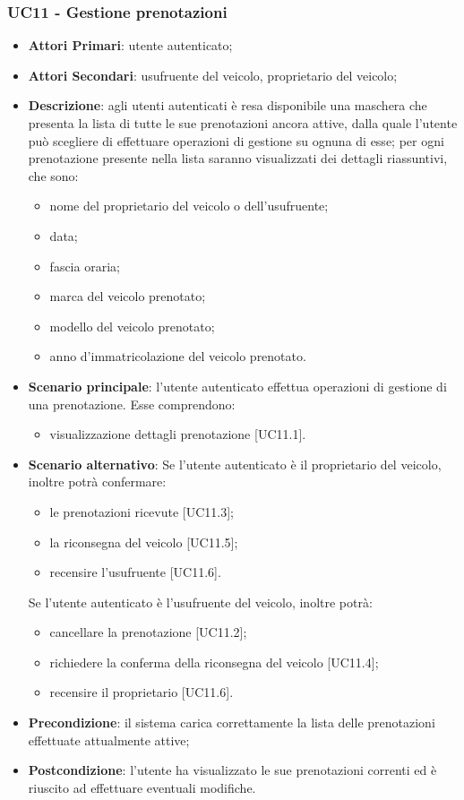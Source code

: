 \subsubsection{UC11 - Gestione prenotazioni}
\begin{itemize}
	\item \textbf{Attori Primari}: utente autenticato;
	\item \textbf{Attori Secondari}:
	usufruente del veicolo, proprietario del veicolo;
	\item \textbf{Descrizione}: agli utenti autenticati è resa disponibile una maschera che presenta la lista di tutte le sue prenotazioni ancora attive, dalla quale l'utente può scegliere di effettuare operazioni di gestione su ognuna di esse;
	per ogni prenotazione presente nella lista saranno visualizzati dei dettagli riassuntivi, che sono:
	\begin{itemize}
		\item nome del proprietario del veicolo o dell'usufruente;
		\item data;
		\item fascia oraria;
		\item marca del veicolo prenotato;
		\item modello del veicolo prenotato;
		\item anno d'immatricolazione del veicolo prenotato.
	\end{itemize}
	\item \textbf{Scenario principale}: l'utente autenticato effettua operazioni di gestione di una prenotazione. Esse comprendono:
	\begin{itemize}
		\item visualizzazione dettagli prenotazione [UC11.1].
	\end{itemize}
	\item \textbf{Scenario alternativo}: Se l'utente autenticato è il proprietario del veicolo, inoltre potrà confermare:
	\begin{itemize}
		\item le prenotazioni ricevute [UC11.3];
		\item la riconsegna del veicolo [UC11.5];
		\item recensire l'usufruente [UC11.6].
	\end{itemize}
	Se l'utente autenticato è l'usufruente del veicolo, inoltre potrà:
	\begin{itemize}
		\item cancellare la prenotazione [UC11.2];
		\item richiedere la conferma della riconsegna del veicolo [UC11.4];
		\item recensire il proprietario [UC11.6].
	\end{itemize}
	\item \textbf{Precondizione}: il sistema carica correttamente la lista delle prenotazioni effettuate attualmente attive;
	\item \textbf{Postcondizione}: l'utente ha visualizzato le sue prenotazioni correnti ed è riuscito ad effettuare eventuali modifiche.
\end{itemize} 
